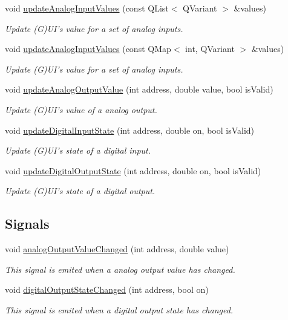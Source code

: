 \begin{DoxyCompactItemize}
\item 
void \hyperlink{classmdt_device_ios_a82850ee99957ec5a787de71299ad785b}{updateAnalogInputValues} (const QList$<$ QVariant $>$ \&values)
\begin{DoxyCompactList}\small\item\em Update (G)UI's value for a set of analog inputs. \end{DoxyCompactList}\item 
void \hyperlink{classmdt_device_ios_a33fcf4b3c8f03b25988b1d2df9a56669}{updateAnalogInputValues} (const QMap$<$ int, QVariant $>$ \&values)
\begin{DoxyCompactList}\small\item\em Update (G)UI's value for a set of analog inputs. \end{DoxyCompactList}\item 
void \hyperlink{classmdt_device_ios_aaa6fbf435ddf8760487d962e1a6307f2}{updateAnalogOutputValue} (int address, double value, bool isValid)
\begin{DoxyCompactList}\small\item\em Update (G)UI's value of a analog output. \end{DoxyCompactList}\item 
void \hyperlink{classmdt_device_ios_a1ce6f74fbcc8d2a72c64ea76ee4d1aea}{updateDigitalInputState} (int address, double on, bool isValid)
\begin{DoxyCompactList}\small\item\em Update (G)UI's state of a digital input. \end{DoxyCompactList}\item 
void \hyperlink{classmdt_device_ios_a6407c4a5dfbc40937cf3f4d37345e825}{updateDigitalOutputState} (int address, double on, bool isValid)
\begin{DoxyCompactList}\small\item\em Update (G)UI's state of a digital output. \end{DoxyCompactList}\end{DoxyCompactItemize}
\subsection*{Signals}
\begin{DoxyCompactItemize}
\item 
void \hyperlink{classmdt_device_ios_a557968ec5b15f3beec2a0aa85068a663}{analogOutputValueChanged} (int address, double value)
\begin{DoxyCompactList}\small\item\em This signal is emited when a analog output value has changed. \end{DoxyCompactList}\item 
void \hyperlink{classmdt_device_ios_a6f2647e97f836f1ff184816172a46283}{digitalOutputStateChanged} (int address, bool on)
\begin{DoxyCompactList}\small\item\em This signal is emited when a digital output state has changed. \end{DoxyCompactList}\end{DoxyCompactItemize}
